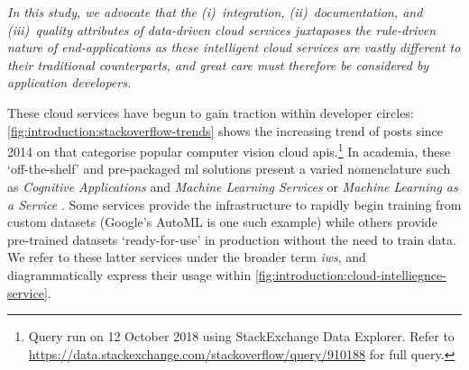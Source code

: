 

\begin{framed}
\itshape
\noindent
In this study, we advocate that the (i)~integration, (ii)~documentation, and (iii)~quality attributes of data-driven cloud services juxtaposes the rule-driven nature of end-applications as these intelligent cloud services are vastly different to their traditional counterparts, and great care must therefore be considered by application developers.
\end{framed}
\upshape
\bigskip

These cloud services have begun to gain traction within developer circles: \cref{fig:introduction:stackoverflow-trends} shows the increasing trend of posts since 2014 on  that categorise popular computer vision cloud \glspl{api}.\footnote{Query run on 12 October 2018 using StackExchange Data Explorer. Refer to \url{https://data.stackexchange.com/stackoverflow/query/910188} for full query.} In academia, these `off-the-shelf' and pre-packaged \gls{ml} solutions present a varied nomenclature such as \textit{Cognitive Applications} and \textit{Machine Learning Services} \citep{Hwang:2017tr} or \textit{Machine Learning as a Service} \citep{Ribeiro:2015dz}. Some services provide the infrastructure to rapidly begin training from custom datasets (Google's AutoML is one such example) while others provide pre-trained datasets `ready-for-use' in production without the need to train data. We refer to these latter services under the broader term \textit{\gls{iws}}, and diagrammatically express their usage within \cref{fig:introduction:cloud-intelliegnce-service}.


